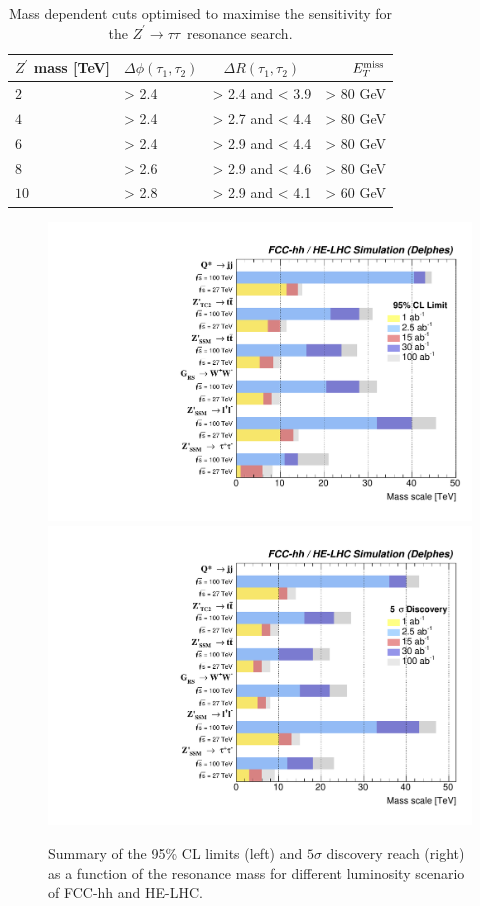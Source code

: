 \documentclass[a4paper,11pt]{article}
\newcommand{\Zp}{\ensuremath{Z^{\prime}}}
\newcommand*{\Zptata}{\ensuremath{Z^{\prime}\rightarrow \tau\tau}}
\newcommand*{\met}{\ensuremath{E_{T}^{\rm{miss}}}}
\begin{document}
\begin{table}[!htb]
   \centering
\begin{tabular}{|l|l|c|r|}
  \hline
   $\Zp$ mass [TeV] &  $\Delta \phi(\tau_1, \tau_2)$&  $\Delta R(\tau_1, \tau_2)$ & $\met$\\
  \hline
   $2$ & > 2.4 & > 2.4 and < 3.9 & > 80 GeV\\
   $4$ & > 2.4 & > 2.7 and < 4.4 & > 80 GeV\\
   $6$ & > 2.4 & > 2.9 and < 4.4 & > 80 GeV\\
   $8$ & > 2.6 & > 2.9 and < 4.6 & > 80 GeV\\
  $10$ & > 2.8 & > 2.9 and < 4.1 & > 60 GeV\\
  \hline
  \end{tabular}
  \caption{Mass dependent cuts optimised to maximise the sensitivity for the \Zptata\ resonance search.}
  \label{tab:leptonicresonances:tautau27}
\end{table}




\begin{figure}[!htb]
  \centering
  \includegraphics[width=0.49\columnwidth]{Fig/summaryLimit.pdf}
  \includegraphics[width=0.49\columnwidth]{Fig/summaryDisco.pdf}
  \caption{Summary of the 95\% CL limits (left) and $5\sigma$ discovery reach (right) as a function of the resonance mass for different luminosity scenario of FCC-hh and HE-LHC.}
  \label{figure:resonances:summary}
\end{figure}
\end{document}
